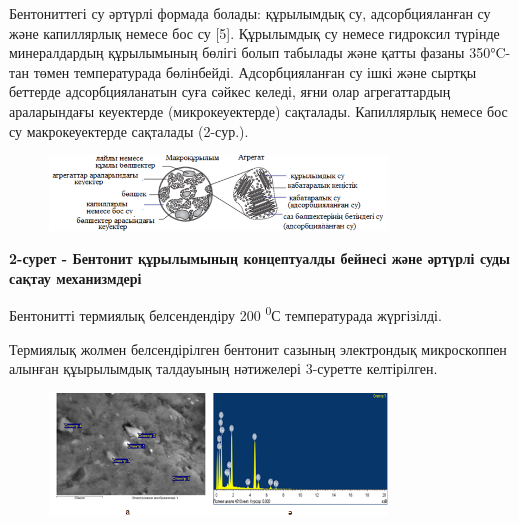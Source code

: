Бентониттегі су әртүрлі формада болады: құрылымдық су, адсорбцияланған
су және капиллярлық немесе бос су {[}5{]}. Құрылымдық су немесе
гидроксил түрінде минералдардың құрылымының бөлігі болып табылады және
қатты фазаны 350°C-тан төмен температурада бөлінбейді. Адсорбцияланған
су ішкі және сыртқы беттерде адсорбцияланатын суға сәйкес келеді, яғни
олар агрегаттардың араларындағы кеуектерде (микрокеуектерде) сақталады.
Капиллярлық немесе бос су макрокеуектерде сақталады (2-сур.).

\begin{figure}[H]
	\centering
	\includegraphics[width=0.8\textwidth]{assets/1044}
	\caption*{}
\end{figure}

\textbf{2-сурет - Бентонит құрылымының концептуалды бейнесі және әртүрлі
суды} \textbf{сақтау механизмдері}

Бентонитті термиялық белсендендіру 200 \textsuperscript{0}С
температурада жүргізілді.

Термиялық жолмен белсендірілген бентонит сазының электрондық
микроскоппен алынған құырылымдық талдауының нәтижелері 3-суретте
келтірілген.

\begin{figure}[H]
	\centering
	\includegraphics[width=0.8\textwidth]{assets/1045}
	\caption*{}
\end{figure}

